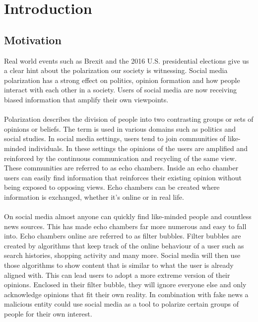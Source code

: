 \chapter{Introduction}
\label{ch:Introduction}


\section{Motivation}
\label{sec:motivation}

Real world events such as Brexit and the 2016 U.S. presidential elections give us a clear hint about the polarization our society is witnessing. Social media polarization has a strong effect on politics, opinion formation and how people interact with each other in a society. Users of social media are now receiving biased information that amplify their own viewpoints. 
\\
\\
Polarization describes the division of people into two contrasting groups or sets of opinions or beliefs. The term is used in various domains such as politics and social studies.
In social media settings, users tend to join communities of like-minded individuals.
In these settings the opinions of the users are amplified and reinforced by the continuous  communication and recycling of the same view. These communities are referred to as echo chambers.
Inside an echo chamber users can easily find information that reinforces their existing opinion without being exposed to opposing views.
Echo chambers can be created where information is exchanged, whether it’s online or in real life. 
\\
\\
On social media almost anyone can quickly find like-minded people and countless news sources. This has made echo chambers far more numerous and easy to fall into. Echo chambers online are referred to as filter bubbles. Filter bubbles are created by algorithms that keep track of the online behaviour of a user such as search histories, shopping activity and many more. Social media will then use those algorithms to show content that is similar to what the user is already aligned with. This can lead users to adopt a more extreme version of their opinions. 
Enclosed in their filter bubble, they will ignore everyone else and only acknowledge opinions that fit their own reality. In combination with fake news a malicious entity could use social media as a tool to polarize certain groups of people for their own interest. 
\\
\\
